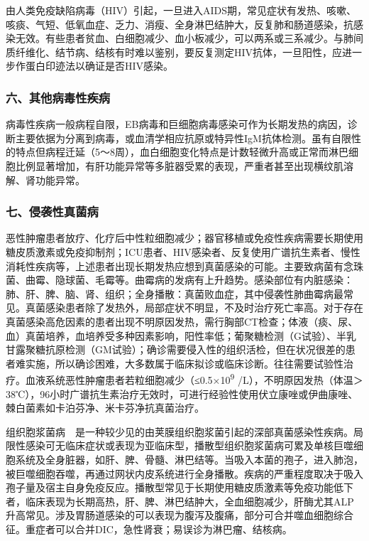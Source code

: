 由人类免疫缺陷病毒（HIV）引起，一旦进入AIDS期，常见症状有发热、咳嗽、咳痰、气短、低氧血症、乏力、消瘦、全身淋巴结肿大，反复肺和肠道感染，抗感染无效。有些患者贫血、白细胞减少、血小板减少，可以两系或三系减少。与肺间质纤维化、结节病、结核有时难以鉴别，要反复测定HIV抗体，一旦阳性，应进一步作蛋白印迹法以确证是否HIV感染。

\subsubsection{六、其他病毒性疾病}

病毒性疾病一般病程自限，EB病毒和巨细胞病毒感染可作为长期发热的病因，诊断主要依据为分离到病毒，或血清学相应抗原或特异性IgM抗体检测。虽有自限性的特点但病程迁延（5～8周），血白细胞变化特点是计数轻微升高或正常而淋巴细胞比例显著增加，有肝功能异常等多脏器受累的表现，严重者甚至出现横纹肌溶解、肾功能异常。

\subsubsection{七、侵袭性真菌病}

恶性肿瘤患者放疗、化疗后中性粒细胞减少；器官移植或免疫性疾病需要长期使用糖皮质激素或免疫抑制剂；ICU患者、HIV感染者、反复使用广谱抗生素者、慢性消耗性疾病等，上述患者出现长期发热应想到真菌感染的可能。主要致病菌有念珠菌、曲霉、隐球菌、毛霉等。曲霉病的发病有上升趋势。感染部位有内脏感染：肺、肝、脾、脑、肾、组织；全身播散：真菌败血症，其中侵袭性肺曲霉病最常见。真菌感染患者除了发热外，局部症状不明显，不及时治疗死亡率高。对于存在真菌感染高危因素的患者出现不明原因发热，需行胸部CT检查；体液（痰、尿、血）真菌培养，血培养受多种因素影响，阳性率低；葡聚糖检测（G试验）、半乳甘露聚糖抗原检测（GM试验）；确诊需要侵入性的组织活检，但在状况很差的患者难实施，所以确诊困难，大多数属于临床拟诊或临床诊断。往往需要试验性治疗。血液系统恶性肿瘤患者若粒细胞减少（≤0.5×10\textsuperscript{9}
/L），不明原因发热（体温＞38℃），96小时广谱抗生素治疗无效时，可进行经验性使用伏立康唑或伊曲康唑、棘白菌素如卡泊芬净、米卡芬净抗真菌治疗。

组织胞浆菌病　是一种较少见的由荚膜组织胞浆菌引起的深部真菌感染性疾病。局限性感染可无临床症状或表现为亚临床型，播散型组织胞浆菌病可累及单核巨噬细胞系统及全身脏器，如肝、脾、骨髓、淋巴结等。当吸入本菌的孢子，进入肺泡，被巨噬细胞吞噬，再通过网状内皮系统进行全身播散。疾病的严重程度取决于吸入孢子量及宿主自身免疫反应。播散型常见于长期使用糖皮质激素等免疫功能低下者，临床表现为长期高热，肝、脾、淋巴结肿大，全血细胞减少，肝酶尤其ALP升高常见。涉及胃肠道感染的可以表现为腹泻及腹痛，部分可合并噬血细胞综合征。重症者可以合并DIC，急性肾衰；易误诊为淋巴瘤、结核病。

